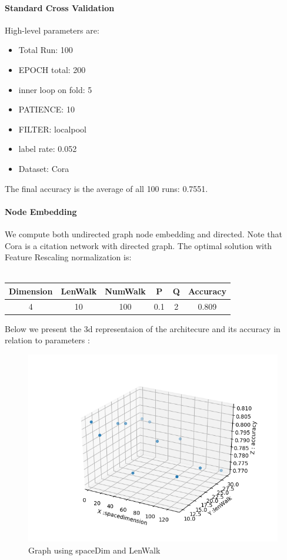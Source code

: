 \documentclass{report}
\begin{document}
\paragraph{Standard Cross Validation} High-level parameters are:
\begin{itemize}
\item Total Run: 100
\item EPOCH total: 200
\item inner loop on fold: 5
\item PATIENCE: 10
\item FILTER: localpool
\item label rate: 0.052
\item Dataset: Cora
\end{itemize}
The final accuracy is the average of all 100 runs:  0.7551.
\paragraph{Node Embedding}
We compute both undirected graph node embedding and directed.
Note that Cora is a citation network with directed graph.
The optimal solution with Feature Rescaling normalization is:\\\\
\begin{table}[htb]
\centering

\begin{tabular}{|c|c|c|c|c|c|}
\hline
Dimension & LenWalk & NumWalk & P & Q& Accuracy \\ 
\hline
4    &  10   & 100  &  0.1   &  2 & 0.809   \\
\hline
\end{tabular}
\end{table}

Below we present the 3d representaion of the architecure and its accuracy in relation to parameters :

\begin{figure}[htbp]
\centering
\includegraphics[scale=0.7]{01.png}
\caption{Graph using spaceDim and LenWalk}
\label{fig:01}
\end{figure}
\end{document}
